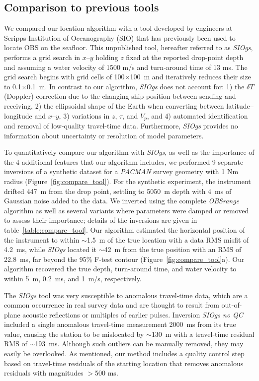 \subsection{Comparison to previous tools}

We compared our location algorithm with a tool developed by engineers at Scripps Institution of Oceanography (SIO) that has previously been used to locate OBS on the seafloor. This unpublished tool, hereafter referred to as \textit{SIOgs}, performs a grid search in $x$--$y$ holding $z$ fixed at the reported drop-point depth and assuming a water velocity of 1500 m/s and turn-around time of 13 ms. The grid search begins with grid cells of 100$\times$100~m and iteratively reduces their size to 0.1$\times$0.1~m. In contrast to our algorithm, \textit{SIOgs} does not account for: 1) the $\delta T$ (Doppler) correction due to the changing ship position between sending and receiving, 2) the ellipsoidal shape of the Earth when converting between latitude--longitude and $x$--$y$, 3) variations in $z$, $\tau$, and $V_p$, and 4) automated identification and removal of low-quality travel-time data. Furthermore, \textit{SIOgs} provides no information about uncertainty or resolution of model parameters.  

To quantitatively compare our algorithm with \textit{SIOgs}, as well as the importance of the 4 additional features that our algorithm includes, we performed 9 separate inversions of a synthetic dataset for a \textit{PACMAN} survey geometry with 1 Nm radius (Figure~\ref{fig:compare_tool}). For the synthetic experiment, the instrument drifted 447~m from the drop point, settling to 5050~m depth with 4~ms of Gaussian noise added to the data. We inverted using the complete \textit{OBSrange} algorithm as well as several variants where parameters were damped or removed to assess their importance; details of the inversions are given in table~\ref{table:compare_tool}. Our algorithm estimated the horizontal position of the instrument to within $\sim$1.5~m of the true location with a data RMS misfit of 4.2~ms, while \textit{SIOgs} located it $\sim$42~m from the true position with an RMS of 22.8~ms, far beyond the 95\% F-test contour (Figure~\ref{fig:compare_tool}a). Our algorithm recovered the true depth, turn-around time, and water velocity to within 5~m, 0.2~ms, and 1~m/s, respectively.

The \textit{SIOgs} tool was very susceptible to anomalous travel-time data, which are a common occurrence in real survey data and are thought to result from out-of-plane acoustic reflections or multiples of earlier pulses. Inversion \textit{SIOgs no QC} included a single anomalous travel-time measurement 2000~ms from its true value, causing the station to be mislocated by $\sim$130~m with a travel-time residual RMS of $\sim$193~ms. Although such outliers can be manually removed, they may easily be overlooked. As mentioned, our method includes a quality control step based on travel-time residuals of the starting location that removes anomalous residuals with magnitudes $>$500 ms.

